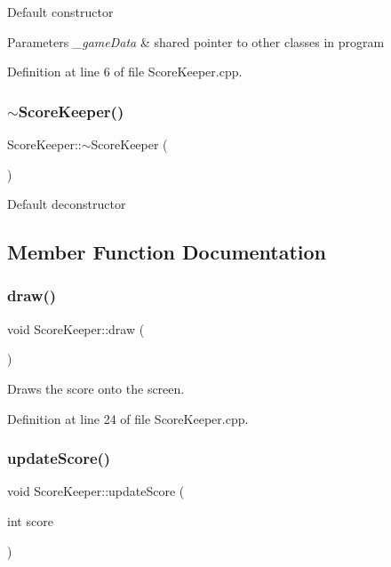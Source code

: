 Default constructor 
\begin{DoxyParams}{Parameters}
{\em \+\_\+game\+Data} & shared pointer to other classes in program \\
\hline
\end{DoxyParams}


Definition at line 6 of file Score\+Keeper.\+cpp.

\mbox{\label{class_score_keeper_a9c7e1807d09a538f5f806724e52d72e0}} 
\subsubsection{\texorpdfstring{$\sim$ScoreKeeper()}{~ScoreKeeper()}}
{\footnotesize\ttfamily Score\+Keeper\+::$\sim$\+Score\+Keeper (\begin{DoxyParamCaption}{ }\end{DoxyParamCaption})\hspace{0.3cm}{\ttfamily [default]}}

Default deconstructor 

\subsection{Member Function Documentation}
\mbox{\label{class_score_keeper_aa51b77d01ac44caa656b9f2ad474765d}} 
\subsubsection{\texorpdfstring{draw()}{draw()}}
{\footnotesize\ttfamily void Score\+Keeper\+::draw (\begin{DoxyParamCaption}{ }\end{DoxyParamCaption})}

Draws the score onto the screen. 

Definition at line 24 of file Score\+Keeper.\+cpp.

\mbox{\label{class_score_keeper_a5860a6708f7c544ea9dbe222a397ad2c}} 
\subsubsection{\texorpdfstring{updateScore()}{updateScore()}}
{\footnotesize\ttfamily void Score\+Keeper\+::update\+Score (\begin{DoxyParamCaption}\item[{int}]{score }\end{DoxyParamCaption})}

